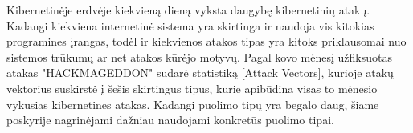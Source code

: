 Kibernetinėje erdvėje kiekvieną dieną vyksta daugybę kibernetinių atakų. Kadangi kiekviena internetinė sistema yra skirtinga ir naudoja vis kitokias programines įrangas, todėl ir kiekvienos atakos tipas yra kitoks priklausomai nuo sistemos trūkumų ar net atakos kūrėjo motyvų. Pagal kovo mėnesį užfiksuotas atakas "HACKMAGEDDON" sudarė statistiką [Attack Vectors], kurioje atakų vektorius suskirstė į šešis skirtingus tipus, kurie apibūdina visas to mėnesio vykusias kibernetines atakas. Kadangi puolimo tipų yra begalo daug, šiame poskyrije nagrinėjami dažniau naudojami konkretūs puolimo tipai.